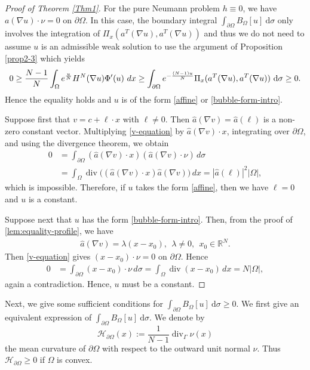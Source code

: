 \documentclass[10pt,a4paper]{amsart}
\numberwithin{equation}{section}
\newcommand{\pa}{\partial}
\newcommand{\R}{\mathbb{R}}
\newcommand{\e}{\textup{e}}
\newcommand{\dx}{\textup{d}x}
\begin{document}
\begin{proof}[Proof of Theorem \ref{Thm1}]
For the pure Neumann problem $h\equiv0$, we have $a(\nabla u) \cdot \nu =0$ on $\pa \Omega$. In this case, the boundary integral $\int_{\pa \Omega} B_{\Omega}[u] \ \text{d} \sigma$ only involves the integration of $\Pi_x(a^T(\nabla u), a^T(\nabla u))$ and thus we do not need to assume $u$ is an admissible weak solution to use the argument of Proposition \ref{prop2-3} which yields
\[
       0 \geq \frac{N-1}{N} \int_{\Omega} \e^{\frac{u}{N}} H^N(\nabla u) \Phi'(u) \ \dx \geq \int_{\pa \Omega} \e^{-\frac{(N-1)u}{N}} \Pi_x(a^T(\nabla u), a^T(\nabla u)) \ \text{d} \sigma \geq 0.
\]
Hence the equality  holds and $u$ is of the form \eqref{affine} or \eqref{bubble-form-intro}.
 
 Suppose first that $v=c+\ell\cdot x$ with $\ell\ne0$. Then $\widehat{a}(\nabla v) = \widehat a(\ell)$ is a non-zero constant vector. 
 Multiplying \eqref{v-equation} by $\hat{a}(\nabla v) \cdot x$, integrating over $\partial\Omega$, and using the divergence theorem, we obtain
\begin{align*}
    0&=\int_{\partial\Omega}( \hat{a}(\nabla v)  \cdot x)(\hat{a}(\nabla v)  \cdot \nu)\,d\sigma\\
    &=\int_\Omega\operatorname{div}\bigl((\hat{a}(\nabla v) \cdot x) \hat{a}(\nabla v)  \bigr)\,dx =|\hat{a}(\ell) |^2|\Omega|,
\end{align*}
which is impossible. Therefore, if $u$ takes the form \eqref{affine}, then we have $\ell =0$ and $u$ is a constant.

Suppose next that $u$ has the form \eqref{bubble-form-intro}. Then, from the proof of \eqref{lem:equality-profile}, we have
\begin{align*}
       \hat{a}(\nabla v)  =\lambda (x - x_0),\ \ \lambda\ne0, \ \ x_0 \in \R^N.
\end{align*}
Then \eqref{v-equation} gives $(x-x_0)\cdot\nu=0$ on $\partial\Omega$.  Hence
\begin{align*}
0&=\int_{\partial\Omega}(x-x_0)\cdot\nu\,d\sigma
 =\int_\Omega\operatorname{div}(x-x_0)\,dx
 =N|\Omega|,
\end{align*}
again a contradiction. Hence, $u$ must be a constant.
\end{proof}


Next, we give some sufficient conditions for $\int_{\pa \Omega} B_{\Omega}[u] \ \text{d}\sigma \geq 0$. We first give an equivalent expression of $\int_{\pa \Omega} B_{\Omega} [u] \ \text{d} \sigma$.  We denote by
\[
    \mathcal{H}_{\pa \Omega}(x):=\frac{1}{N-1}\operatorname{div}_\Gamma\nu(x)
\]
the mean curvature of $\partial\Omega$ with respect to the
outward unit normal $\nu$. Thus $\mathcal{H}_{\pa \Omega} \geq0$ if $\Omega$ is convex.
\end{document}
